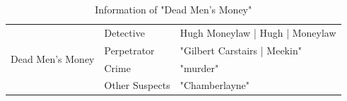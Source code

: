 \documentclass{article}
\begin{document}
\begin{table}[htbp]
\centering
\caption{Information of "Dead Men's Money"}
\begin{tabular}{@{}l|l|l@{}}
\toprule
\multirow{6}{*}{Dead Men's Money} & Detective      & Hugh Moneylaw | Hugh | Moneylaw                                                                                                                                                                                                                                                                                                                                                                                                                                                                                                                                                                                                \\ \cmidrule(l){2-3} 
                                  & Perpetrator    & "Gilbert Carstairs | Meekin"                                                                                                                                                                                                                                                                                                                                                                                                                                                                                                                                                                                                   \\ \cmidrule(l){2-3} 
                                  & Crime          & "murder"                                                                                                                                                                                                                                                                                                                                                                                                                                                                                                                                                                                                                       \\ \cmidrule(l){2-3} 
                                  & Other Suspects &    "Chamberlayne"                                                                                                                                                                                                                                                                                                                                                                                                                                                                                                                                                                                                              \\ \cmidrule(l){2-3} 

\end{tabular}
\end{table}
\end{document}
